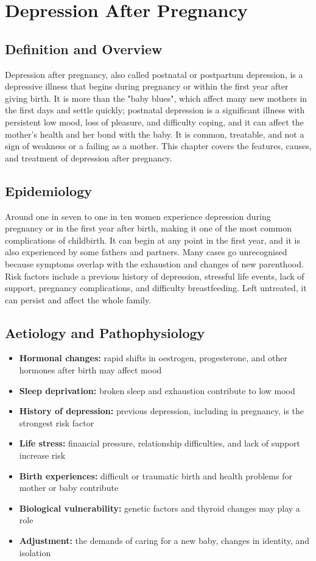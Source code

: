 \chapter{Depression After Pregnancy}

\section*{Definition and Overview}
Depression after pregnancy, also called postnatal or postpartum depression, is a depressive illness that begins during pregnancy or within the first year after giving birth. It is more than the "baby blues", which affect many new mothers in the first days and settle quickly; postnatal depression is a significant illness with persistent low mood, loss of pleasure, and difficulty coping, and it can affect the mother's health and her bond with the baby. It is common, treatable, and not a sign of weakness or a failing as a mother. This chapter covers the features, causes, and treatment of depression after pregnancy.

\section*{Epidemiology}
Around one in seven to one in ten women experience depression during pregnancy or in the first year after birth, making it one of the most common complications of childbirth. It can begin at any point in the first year, and it is also experienced by some fathers and partners. Many cases go unrecognised because symptoms overlap with the exhaustion and changes of new parenthood. Risk factors include a previous history of depression, stressful life events, lack of support, pregnancy complications, and difficulty breastfeeding. Left untreated, it can persist and affect the whole family.

\section*{Aetiology and Pathophysiology}
\begin{itemize}
    \item \textbf{Hormonal changes:} rapid shifts in oestrogen, progesterone, and other hormones after birth may affect mood
    \item \textbf{Sleep deprivation:} broken sleep and exhaustion contribute to low mood
    \item \textbf{History of depression:} previous depression, including in pregnancy, is the strongest risk factor
    \item \textbf{Life stress:} financial pressure, relationship difficulties, and lack of support increase risk
    \item \textbf{Birth experiences:} difficult or traumatic birth and health problems for mother or baby contribute
    \item \textbf{Biological vulnerability:} genetic factors and thyroid changes may play a role
    \item \textbf{Adjustment:} the demands of caring for a new baby, changes in identity, and isolation
\end{itemize}

